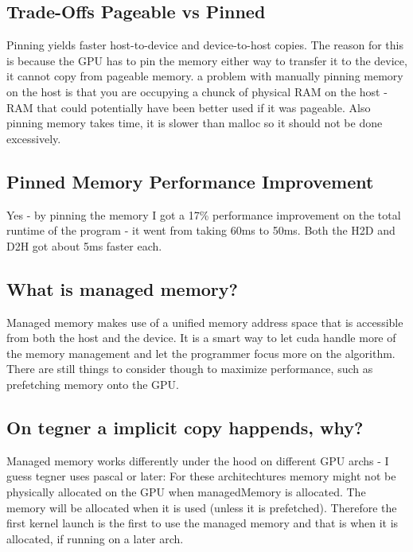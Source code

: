 \documentclass{article}
\begin{document}
\subsection{Trade-Offs Pageable vs Pinned}%
\label{sub:trade_offs_pageable_vs_pinned}

Pinning yields faster host-to-device and device-to-host copies. The reason for this is because the GPU has to pin the memory either way to transfer it to the device, it cannot copy from pageable memory.  a problem with
manually pinning memory on the host is that you are occupying a chunck of physical RAM on the host - RAM that could potentially have been better used if it was pageable. Also pinning memory takes time, it is slower than
malloc so it should not be done excessively.

\subsection{Pinned Memory Performance Improvement}%
\label{sub:trade_offs_pageable_vs_pinned}

Yes - by pinning the memory I got a 17\% performance improvement on the total runtime of the program - it went from taking 60ms to 50ms. Both the H2D and D2H got about 5ms faster each.

\subsection{What is managed memory?}%
\label{sub:what_is_managed_memory_}



Managed memory makes use of a unified memory address space that is accessible from both the host and the device. It is a smart way to let cuda handle more of the memory management and let the programmer focus more on the
algorithm. There are still things to consider though to maximize performance, such as prefetching memory onto the GPU.

\subsection{On tegner a implicit copy happends, why?}%
\label{sub:on_tegner_a_implicit_copy_happends_why_}



Managed memory works differently under the hood on different GPU archs - I guess tegner uses pascal or later: For these architechtures memory might not be physically allocated on the GPU when managedMemory is allocated. The
memory will be allocated when it is used (unless it is prefetched). Therefore the first kernel launch is the first to use the managed memory and that is when it is allocated, if running on a later arch.
\end{document}
